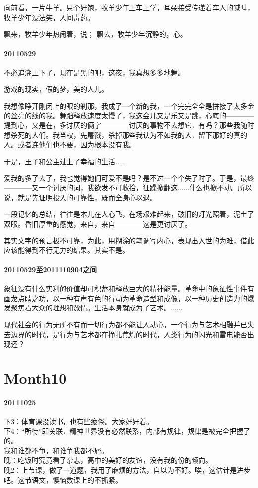 \documentclass[UTF8]{book}
\begin{document}
向前看，一片牛羊。只个好饱，牧羊少年上车上学，耳朵接受传递着车人的喊叫，牧羊少年没法笑，人间毒药。

飘来，牧羊少年热闹着，说；
飘去，牧羊少年沉静的，心。


\paragraph{20110529}

不必追溯上下了，现在是黑的吧，这夜，我真想多多地舞。

游戏的现实，假的梦，美的人儿。

我想像睁开刚闭上的眼的刹那，我成了一个新的我，一个完完全全是拼接了太多金的丝亮的线的我。舞蹈释放速度太慢了，我这会儿又是乐又是跳，心底的————提到心，又是在，多讨厌的俩字————讨厌的事物不去想它，有吗？那些我随时想杀死的人们。我当权，先屠戮，杀掉那些我认为不如我的人，留下那好的真的人。或者连他们也不要，因为根本没有我。

于是，王子和公主过上了幸福的生活......

爱我的多了去了，我也觉得她们可爱不是吗？是不过一个个失了时了。于是，最终————又一个讨厌的词，我欲发不可收拾，狂躁掀翻这......什么也掀不动。所以说，就是先证明投入的可靠性，既而全身心以退。

一段记忆的总结，往往是本儿在人心飞，在场艰难起来，破旧的灯光照着，泥土了双眼。昏旧厚重的感觉，来自，来自————这是更讨厌了。

其实文字的预言极不可靠，为此，用糊涂的笔调写内心，表现出入世的为难，借此应该能得到不行无力的结果。其实不是。


\paragraph{20110529至2011110904之间}

象征没有什么实利的价值却可积蓄和释放巨大的精神能量。革命中的象征性事件有画龙点睛之功，以一种有声有色的行动为革命造型和成像，以一种历史创造力的爆发聚焦着大众的理想和激情。生活本身就成为了艺术。......

现代社会的行为无所不有而一切行为都不能让人动心，一个行为与艺术相融并已失去边界的时代，是行为与艺术都在挣扎焦灼的时代，人类行为的闪光和雷电能否出现还？








\section{Month10}
\paragraph{20111025}
下3：体育课没读书，也有些疲倦。大家好好着。\\
下4：“所待”即关联，精神世界没有必然联系，内部有规律，规律是被完全把握了的。\\
我和谁都不争，和谁争我都不屑。\\
晚：吃饭时究竟看了杂志，高中的美好的友谊，没有我的份的倾向。\\
晚2：上节课，做了一道题，我用了麻烦的方法，自以为不好。唉，这估计是进步吧。这节语文，懊恼数课上的不抓紧。
\end{document}
